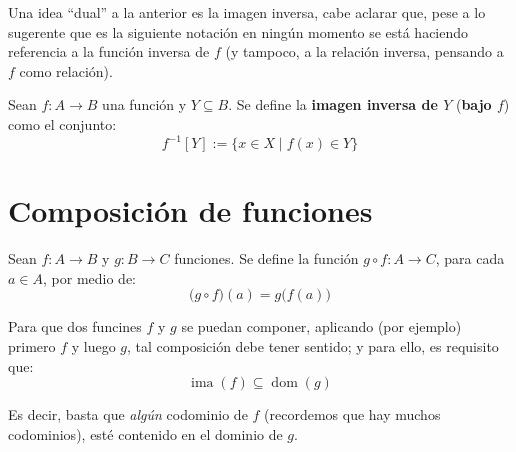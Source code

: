 \documentclass[letterpaper,DIV=14,headsepline,12pt]{scrartcl}
\providecommand\tq{\;|\;}
\DeclareMathOperator{\ima}{ima}
\DeclareMathOperator{\dom}{dom}
\begin{document}
    Una idea ``dual'' a la anterior es la imagen inversa, cabe aclarar que, pese a lo sugerente que es la siguiente notación en ningún momento se está haciendo referencia a la función inversa de $f$ (y tampoco, a la relación inversa, pensando a $f$ como relación).

    \begin{definicion}
        Sean $f:A \to B$ una función y $Y \subseteq B$. Se define la \textbf{imagen inversa de $Y$} (\textbf{bajo $f$}) como el conjunto:
        \[ f^{-1}[Y]:=\{ x \in X \tq f(x) \in Y \} \]
    \end{definicion}

    



    \newpage
    \section{Composición de funciones}
    \begin{definicion}
        Sean $f: A \to B$ y $g: B \to C$ funciones. Se define la función $g \circ f:A \to C$, para cada $a \in A$, por medio de:
        \[ \big( g \circ f \big)(a) = g\big( f(a) \big) \]
    \end{definicion}

    \begin{observacion}
        Para que dos funcines $f$ y $g$ se puedan componer, aplicando (por ejemplo) primero $f$ y luego $g$, tal composición debe tener sentido; y para ello, es requisito que:
        \[ \ima(f) \subseteq \dom(g) \]

        Es decir, basta que \textit{algún} codominio de $f$ (recordemos que hay muchos codominios), esté contenido en el dominio de $g$.
    \end{observacion}
    
    
\end{document}
